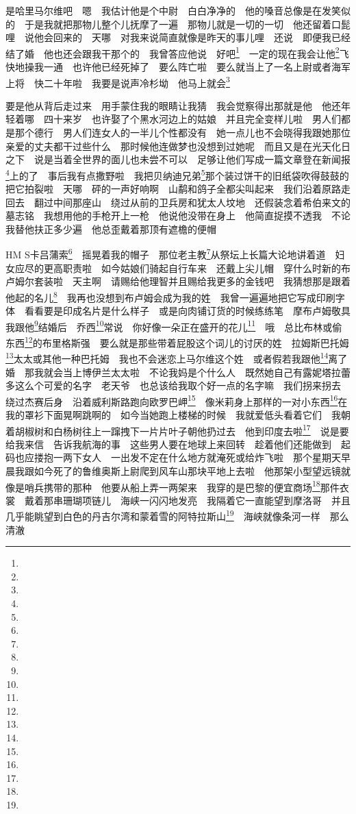 \par 是哈里马尔维吧　嗯　我估计他是个中尉　白白净净的　他的嗓音总像是在发笑似的　于是我就把那物儿整个儿抚摩了一遍　那物儿就是一切的一切　他还留着口髭哩　说他会回来的　天哪　对我来说简直就像是昨天的事儿哩　还说　即便我已经结了婚　他也还会跟我干那个的　我曾答应他说　好吧\footnote{}　一定的现在我会让他\footnote{}飞快地操我一通　也许他已经死掉了　要么阵亡啦　要么就当上了一名上尉或者海军上将　快二十年啦　我要是说声冷杉坳　他马上就会\footnote{}　
\par 要是他从背后走过来　用手蒙住我的眼睛让我猜　我会觉察得出那就是他　他还年轻着哪　四十来岁　也许娶了个黑水河边上的姑娘　并且完全变样儿啦　男人们都是那个德行　男人们连女人的一半儿个性都没有　她一点儿也不会晓得我跟她那位亲爱的丈夫都干过些什么　那时候他连做梦也没想到过她呢　而且又是在光天化日之下　说是当着全世界的面儿也未尝不可以　足够让他们写成一篇文章登在新闻报\footnote{}上的了　事后我有点撒野啦　我把贝纳迪兄弟\footnote{}那个装过饼干的旧纸袋吹得鼓鼓的　把它拍裂啦　天哪　砰的一声好响啊　山鹬和鸽子全都尖叫起来　我们沿着原路走回去　翻过中间那座山　绕过从前的卫兵房和犹太人坟地　还假装念着希伯来文的墓志铭　我想用他的手枪开上一枪　他说他没带在身上　他简直捉摸不透我　不论我替他扶正多少遍　他总歪戴着那顶有遮檐的便帽　
\par HM S卡吕蒲索\footnote{}　摇晃着我的帽子　那位老主教\footnote{}从祭坛上长篇大论地讲着道　妇女应尽的更高职责啦　如今姑娘们骑起自行车来　还戴上尖儿帽　穿什么时新的布卢姆尔套装啦　天主啊　请赐给他理智并且赐给我更多的金钱吧　我猜想那是跟着他起的名儿\footnote{}　我再也没想到布卢姆会成为我的姓　我曾一遍遍地把它写成印刷字体　看看要是印成名片是什么样子　或是向肉铺订货的时候练练笔　摩布卢姆敬具　我跟他\footnote{}结婚后　乔西\footnote{}常说　你好像一朵正在盛开的花儿\footnote{}　哦　总比布林或偷东西\footnote{}的布里格斯强　要么就是那些带着屁股这个词儿的讨厌的姓　拉姆斯巴托姆\footnote{}太太或其他一种巴托姆　我也不会迷恋上马尔维这个姓　或者假若我跟他\footnote{}离了婚　那我就会当上博伊兰太太啦　不论我妈是个什么人　既然她自己有露妮塔拉蕾多这么个可爱的名字　老天爷　也总该给我取个好一点的名字嘛　我们拐来拐去　绕过杰赛后身　沿着威利斯路跑向欧罗巴岬\footnote{}　像米莉身上那样的一对小东西\footnote{}在我的罩衫下面晃啊跳啊的　如今当她跑上楼梯的时候　我就爱低头看着它们　我朝着胡椒树和白杨树往上一蹿拽下一片片叶子朝他扔过去　他到印度去啦\footnote{}　说是要给我来信　告诉我航海的事　这些男人要在地球上来回转　趁着他们还能做到　起码也应搂抱一两下女人　一出发不定在什么地方就淹死或给炸飞啦　那个星期天早晨我跟如今死了的鲁维奥斯上尉爬到风车山那块平地上去啦　他那架小型望远镜就像是哨兵携带的那种　他要从船上弄一两架来　我穿的是巴黎的便宜商场\footnote{}那件衣裳　戴着那串珊瑚项链儿　海峡一闪闪地发亮　我隔着它一直能望到摩洛哥　并且几乎能眺望到白色的丹吉尔湾和蒙着雪的阿特拉斯山\footnote{}　海峡就像条河一样　那么清澈　

